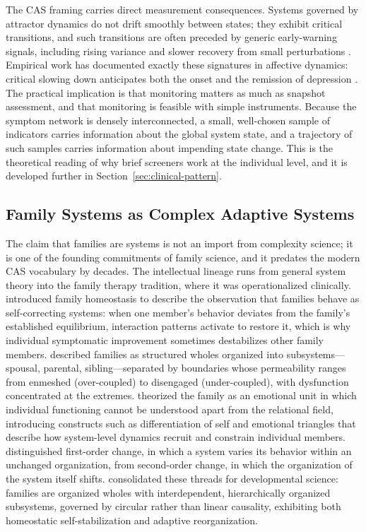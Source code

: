 \documentclass[12pt, letterpaper]{article}
\begin{document}
The CAS framing carries direct measurement consequences. Systems governed by attractor dynamics do not drift smoothly between states; they exhibit critical transitions, and such transitions are often preceded by generic early-warning signals, including rising variance and slower recovery from small perturbations \parencite{scheffer2009}. Empirical work has documented exactly these signatures in affective dynamics: critical slowing down anticipates both the onset and the remission of depression \parencite{vandeLeemput2014}. The practical implication is that monitoring matters as much as snapshot assessment, and that monitoring is feasible with simple instruments. Because the symptom network is densely interconnected, a small, well-chosen sample of indicators carries information about the global system state, and a trajectory of such samples carries information about impending state change. This is the theoretical reading of why brief screeners work at the individual level, and it is developed further in Section~\ref{sec:clinical-pattern}.

\subsection{Family Systems as Complex Adaptive Systems}
\label{sec:family-cas}

The claim that families are systems is not an import from complexity science; it is one of the founding commitments of family science, and it predates the modern CAS vocabulary by decades. The intellectual lineage runs from general system theory \parencite{vonbertalanffy1968} into the family therapy tradition, where it was operationalized clinically. \textcite{jackson1957} introduced family homeostasis to describe the observation that families behave as self-correcting systems: when one member's behavior deviates from the family's established equilibrium, interaction patterns activate to restore it, which is why individual symptomatic improvement sometimes destabilizes other family members. \textcite{minuchin1974} described families as structured wholes organized into subsystems---spousal, parental, sibling---separated by boundaries whose permeability ranges from enmeshed (over-coupled) to disengaged (under-coupled), with dysfunction concentrated at the extremes. \textcite{bowen1978} theorized the family as an emotional unit in which individual functioning cannot be understood apart from the relational field, introducing constructs such as differentiation of self and emotional triangles that describe how system-level dynamics recruit and constrain individual members. \textcite{watzlawick1974} distinguished first-order change, in which a system varies its behavior within an unchanged organization, from second-order change, in which the organization of the system itself shifts. \textcite{cox1997} consolidated these threads for developmental science: families are organized wholes with interdependent, hierarchically organized subsystems, governed by circular rather than linear causality, exhibiting both homeostatic self-stabilization and adaptive reorganization.
\end{document}
